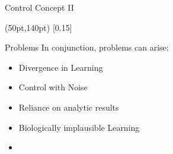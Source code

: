 \documentclass[17pt, t, lualatex]{beamer}
\begin{document}
\begin{frame}{Control Concept II}
	
	\begin{textblock*}{50pt}(50pt,140pt)
	\scalebox{0.15}[0.15]{
	}
	\end{textblock*}		
		
\end{frame}


\begin{frame}{Problems}	
	In conjunction, problems can arise:\\
	\begin{itemize}
		\setlength\itemsep{1.5em}
		\item Divergence in Learning
		\item Control with Noise
		\item Reliance on analytic results
		\item Biologically implausible Learning
		\item 
	\end{itemize}
\end{frame}
\end{document}

